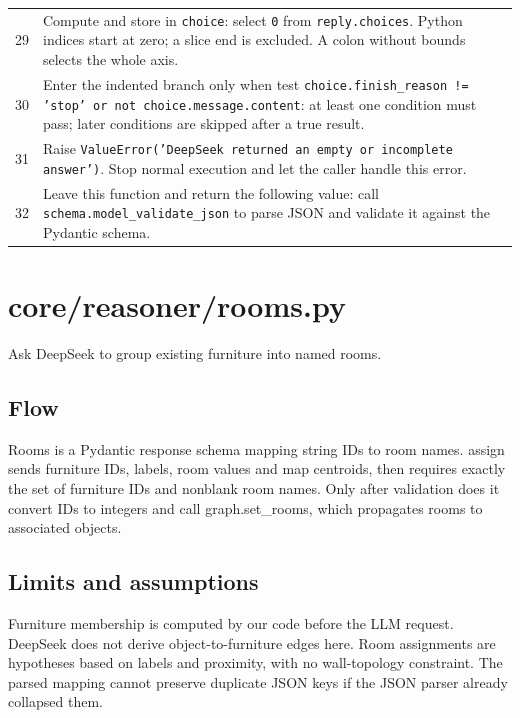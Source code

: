 \documentclass[11pt,a4paper]{book}
\begin{document}
\begin{longtable}{r p{}}
29 & Compute and store in \texttt{choice}: select \texttt{0} from \texttt{reply.choices}. Python indices start at zero; a slice end is excluded. A colon without bounds selects the whole axis.  \\

30 & Enter the indented branch only when test \texttt{choice.finish\_reason != 'stop' or not choice.message.content}: at least one condition must pass; later conditions are skipped after a true result. \\

31 & Raise \texttt{ValueError('DeepSeek returned an empty or incomplete answer')}. Stop normal execution and let the caller handle this error. \\

32 & Leave this function and return the following value: call \texttt{schema.model\_validate\_json} to parse JSON and validate it against the Pydantic schema. \\

\end{longtable}

\chapter{core/reasoner/rooms.py}

Ask DeepSeek to group existing furniture into named rooms.

\section*{Flow}

Rooms is a Pydantic response schema mapping string IDs to room names. assign sends furniture IDs, labels, room values and map centroids, then requires exactly the set of furniture IDs and nonblank room names. Only after validation does it convert IDs to integers and call graph.set\_rooms, which propagates rooms to associated objects.

\section*{Limits and assumptions}

Furniture membership is computed by our code before the LLM request. DeepSeek does not derive object-to-furniture edges here. Room assignments are hypotheses based on labels and proximity, with no wall-topology constraint. The parsed mapping cannot preserve duplicate JSON keys if the JSON parser already collapsed them.
\end{document}
